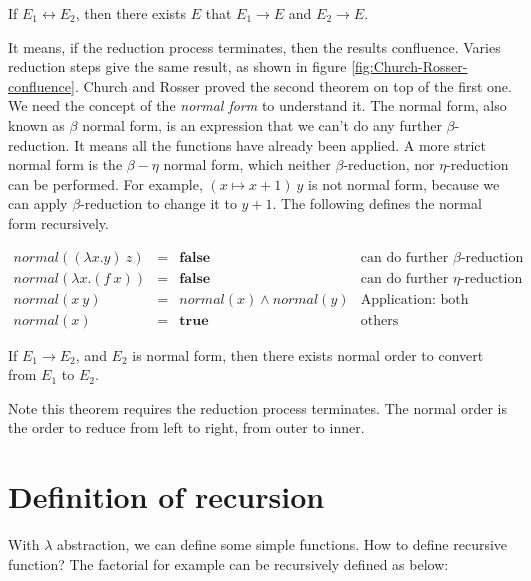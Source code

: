 \documentclass{article}
\begin{document}
\begin{theorem}
If $E_1 \leftrightarrow E_2$, then there exists $E$ that $E_1 \to E$ and $E_2 \to E$.
\end{theorem}

It means, if the reduction process terminates, then the results confluence. Varies reduction steps give the same result, as shown in figure \ref{fig:Church-Rosser-confluence}. Church and Rosser proved the second theorem on top of the first one. We need the concept of the {\em normal form} to understand it. The normal form, also known as $\beta$ normal form, is an expression that we can't do any further $\beta$-reduction. It means all the functions have already been applied. A more strict normal form is the $\beta-\eta$ normal form, which neither $\beta$-reduction, nor $\eta$-reduction can be performed. For example, $(x \mapsto x + 1)\ y$ is not normal form, because we can apply $\beta$-reduction to change it to $y + 1$. The following defines the normal form recursively.

\[
\begin{array}{rcll}
normal((\lambda x . y)\ z) & = & \textbf{false} & \text{can do further $\beta$-reduction} \\
normal(\lambda x . (f\ x)) & = & \textbf{false} & \text{can do further $\eta$-reduction} \\
normal(x\ y) & = & normal(x) \land normal(y) & \text{Application: both function and parameter are normal forms} \\
normal(x) & = & \textbf{true} & \text{others}
\end{array}
\]

\begin{theorem}
If $E_1 \to E_2$, and $E_2$ is normal form, then there exists normal order to convert from $E_1$ to $E_2$.
\end{theorem}

Note this theorem requires the reduction process terminates. The normal order is the order to reduce from left to right, from outer to inner.

\section{Definition of recursion}

With $\lambda$ abstraction, we can define some simple functions. How to define recursive function? The factorial for example can be recursively defined as below:
\end{document}
